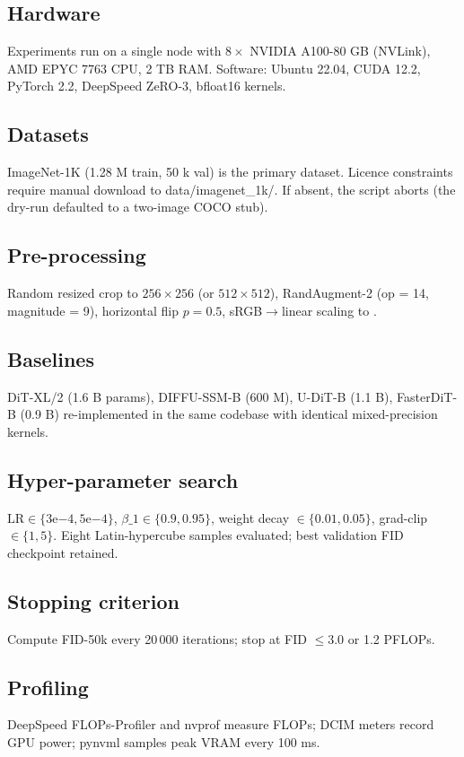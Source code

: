 \documentclass{article}
\begin{document}
\subsection{Hardware}
Experiments run on a single node with $8 \times$ NVIDIA A100-80 GB (NVLink), AMD EPYC 7763 CPU, 2 TB RAM. Software: Ubuntu 22.04, CUDA 12.2, PyTorch 2.2, DeepSpeed ZeRO-3, bfloat16 kernels.

\subsection{Datasets}
ImageNet-1K (1.28 M train, 50 k val) is the primary dataset. Licence constraints require manual download to data/imagenet\_1k/. If absent, the script aborts (the dry-run defaulted to a two-image COCO stub).

\subsection{Pre-processing}
Random resized crop to $256 \times 256$ (or $512 \times 512$), RandAugment-2 (op = 14, magnitude = 9), horizontal flip $p = 0.5$, sRGB$\rightarrow$linear scaling to .

\subsection{Baselines}
DiT-XL/2 (1.6 B params), DIFFU-SSM-B (600 M), U-DiT-B (1.1 B), FasterDiT-B (0.9 B) re-implemented in the same codebase with identical mixed-precision kernels.

\subsection{Hyper-parameter search}
$\text{LR} \in \{3\mathrm{e}{-4}, 5\mathrm{e}{-4}\}$, $\beta\_1 \in \{0.9, 0.95\}$, weight decay $\in \{0.01, 0.05\}$, grad-clip $\in \{1, 5\}$. Eight Latin-hypercube samples evaluated; best validation FID checkpoint retained.

\subsection{Stopping criterion}
Compute FID-50k every 20\,000 iterations; stop at FID $\leq 3.0$ or 1.2 PFLOPs.

\subsection{Profiling}
DeepSpeed FLOPs-Profiler and nvprof measure FLOPs; DCIM meters record GPU power; pynvml samples peak VRAM every 100 ms.
\end{document}
